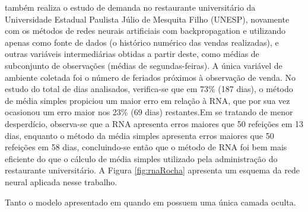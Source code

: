          também realiza o estudo de demanda no restaurante universitário da Universidade Estadual Paulista Júlio de Mesquita Filho (UNESP), novamente com os métodos de redes neurais artificiais com backpropagation e utilizando apenas como fonte de dados (o histórico numérico das vendas realizadas), e outras variáveis intermediárias obtidas a partir deste, como médias de subconjunto de observações (médias de segundas-feiras). A única variável de ambiente coletada foi o número de feriados próximos à observação de venda. No estudo do total de dias analisados, verifica-se que em 73\% (187 dias), o método de média simples propiciou um maior erro em relação à RNA, que por sua vez ocasionou um erro maior nos 23\% (69 dias) restantes.Em se tratando de menor desperdício, observa-se que a RNA apresenta erros maiores que 50 refeições em 13 dias, enquanto o método da média simples apresenta erros maiores que 50 refeições em 58 dias, concluindo-se então que o método de RNA foi bem mais eficiente do que o cálculo de média simples utilizado pela administração do restaurante universitário. A Figura \ref{fig:rnaRocha} apresenta um esquema da rede  neural aplicada nesse trabalho. 
        \begin{figure}[h]
        \end{figure}
        
        Tanto o modelo apresentado em \cite{Rocha2011} quando em \cite{Lopes2008} possuem uma única camada oculta. 
      
